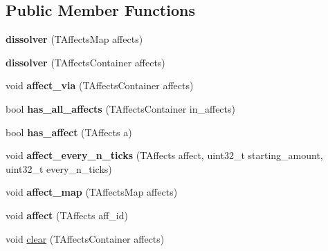 \subsection*{Public Member Functions}
\begin{DoxyCompactItemize}
\item 
\mbox{\label{structmods_1_1affects_1_1dissolver_a539dff8baaec99e0a72fb898dae01299}} 
{\bfseries dissolver} (T\+Affects\+Map affects)
\item 
\mbox{\label{structmods_1_1affects_1_1dissolver_abc41a2519c4f683ed6211ee760a9f746}} 
{\bfseries dissolver} (T\+Affects\+Container affects)
\item 
\mbox{\label{structmods_1_1affects_1_1dissolver_a382f4ebb292806a3aca5635122cb9de1}} 
void {\bfseries affect\+\_\+via} (T\+Affects\+Container affects)
\item 
\mbox{\label{structmods_1_1affects_1_1dissolver_a552da19095c0caddb9fb0bc5aa233776}} 
bool {\bfseries has\+\_\+all\+\_\+affects} (T\+Affects\+Container in\+\_\+affects)
\item 
\mbox{\label{structmods_1_1affects_1_1dissolver_aea716f0b8cf0fea7ef48e829b2b8c8d1}} 
bool {\bfseries has\+\_\+affect} (T\+Affects a)
\item 
\mbox{\label{structmods_1_1affects_1_1dissolver_a91175b4f73883f8034d84380cce73794}} 
void {\bfseries affect\+\_\+every\+\_\+n\+\_\+ticks} (T\+Affects affect, uint32\+\_\+t starting\+\_\+amount, uint32\+\_\+t every\+\_\+n\+\_\+ticks)
\item 
\mbox{\label{structmods_1_1affects_1_1dissolver_a63eef9526551ba54ac683b849c737ae9}} 
void {\bfseries affect\+\_\+map} (T\+Affects\+Map affects)
\item 
\mbox{\label{structmods_1_1affects_1_1dissolver_aefe486fceee597c5c032832ddb25c1f4}} 
void {\bfseries affect} (T\+Affects aff\+\_\+id)
\item 
void \hyperlink{structmods_1_1affects_1_1dissolver_adda06b1b31ee9e7a55ac55132321f811}{clear} (T\+Affects\+Container affects)

\end{DoxyCompactItemize}
